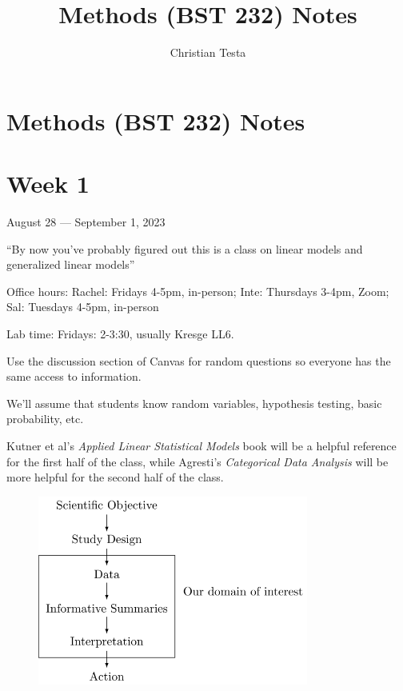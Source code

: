 \documentclass[
  letterpaper,
  DIV=11,
  numbers=noendperiod]{scrreport}
\title{Methods (BST 232) Notes}
\author{Christian Testa}
\date{}
\renewcommand*\contentsname{Table of contents}
\newcommand\contentsname{Table of contents}
\begin{document}
\maketitle
\ifdefined\Shaded\renewenvironment{Shaded}{\begin{tcolorbox}[frame hidden, breakable, borderline west={3pt}{0pt}{shadecolor}, interior hidden, boxrule=0pt, enhanced, sharp corners]}{\end{tcolorbox}}\fi

\renewcommand*\contentsname{Table of contents}
{
\hypersetup{linkcolor=}
\setcounter{tocdepth}{2}
\tableofcontents
}

\hypertarget{methods-bst-232-notes}{%
\chapter{Methods (BST 232) Notes}\label{methods-bst-232-notes}}


\hypertarget{week-1}{%
\chapter{Week 1}\label{week-1}}

August 28 --- September 1, 2023

``By now you've probably figured out this is a class on linear models
and generalized linear models''

Office hours: Rachel: Fridays 4-5pm, in-person; Inte: Thursdays 3-4pm,
Zoom; Sal: Tuesdays 4-5pm, in-person

Lab time: Fridays: 2-3:30, usually Kresge LL6.

Use the discussion section of Canvas for random questions so everyone
has the same access to information.

We'll assume that students know random variables, hypothesis testing,
basic probability, etc.

Kutner et al's \emph{Applied Linear Statistical Models} book will be a
helpful reference for the first half of the class, while Agresti's
\emph{Categorical Data Analysis} will be more helpful for the second
half of the class.

\begin{figure}

{\centering \includegraphics[width=3.5in,height=\textheight]{week1/standalone_figures/scientific_process/scientific_process.svg}

}

\end{figure}
\end{document}
